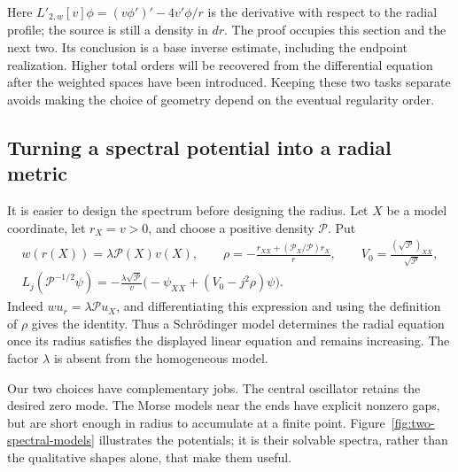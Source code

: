 Here $L'_{2,w}[v]\phi=(v\phi')'-4v'\phi/r$ is the derivative
with respect to the radial profile; the source is still a density in $dr$.
The proof occupies this section and the next two.  Its conclusion is a
base inverse estimate, including the endpoint realization.  Higher total
orders will be recovered from the differential equation after the
weighted spaces have been introduced.  Keeping these two tasks separate
avoids making the choice of geometry depend on the eventual regularity
order.

\subsection{Turning a spectral potential into a radial metric}

It is easier to design the spectrum before designing the radius.  Let
$X$ be a model coordinate, let $r_X=v>0$, and choose a positive density
$\mathcal P$.  Put
\begin{equation}\label{eq:rad-eq-sc0}
 \begin{gathered}
 w(r(X))=\lambda\mathcal P(X)v(X),\qquad
 \rho=-\frac{r_{XX}+(\mathcal P_X/\mathcal P)r_X}{r},\qquad
 V_0=\frac{(\sqrt{\mathcal P})_{XX}}{\sqrt{\mathcal P}},\\
 L_j(\mathcal P^{-1/2}\psi)
   =-\frac{\lambda\sqrt{\mathcal P}}{v}
      \bigl(-\psi_{XX}+(V_0-j^2\rho)\psi\bigr).
 \end{gathered}
\end{equation}
Indeed $wu_r=\lambda\mathcal P u_X$, and differentiating this expression
and using the definition of $\rho$ gives the identity.  Thus a
Schr\"odinger model determines the radial equation once its radius
satisfies the displayed linear equation and remains increasing.
The factor $\lambda$ is absent from the homogeneous model.

Our two choices have complementary jobs.  The central oscillator
retains the desired zero mode.  The Morse models near the ends have
explicit nonzero gaps, but are short enough in radius to accumulate
at a finite point.  Figure~\ref{fig:two-spectral-models} illustrates the
potentials; it is their solvable spectra, rather than the qualitative
shapes alone, that make them useful.

